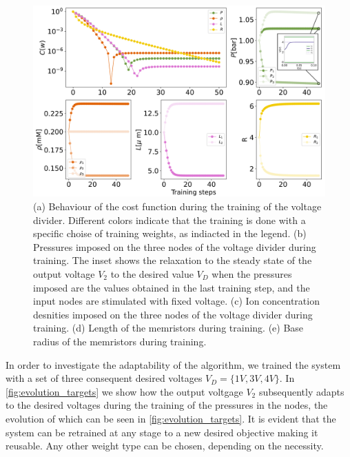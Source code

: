 \documentclass[reprint,superscriptaddress,prb,showkeys]{revtex4-2}
\begin{document}
\begin{figure}[h]
    \centering
    \includegraphics[width=\columnwidth]{plots/voltage_divider/mse_weights_vd.pdf}
    \caption{(a) Behaviour of the cost function during the training of the voltage divider. Different colors indicate that the training is done with a specific choise of training weights, as indiacted in the legend. (b) Pressures imposed on the three nodes of the voltage divider during training. The inset shows the relaxation to the steady state of the output voltage $V_2$ to the desired value $V_D$ when the pressures imposed are the values obtained in the last training step, and the input nodes are stimulated with fixed voltage. (c) Ion concentration desnities imposed on the three nodes of the voltage divider during training. (d) Length of the memristors during training. (e) Base radius of the memristors during training.}\label{fig:mse_weights_vd}
\end{figure} 

In order to investigate the adaptability of the algorithm, we trained the system with a set of three consequent desired voltages $V_D=\{1V, 3V, 4V\}$. In \cref{fig:evolution_targets} we show how the output voltgage $V_2$ subsequently adapts to the desired voltages during the training of the pressures in the nodes, the evolution of which can be seen in \cref{fig:evolution_targets}. It is evident that the system can be retrained at any stage to a new desired objective making it reusable. Any other weight type can be chosen, depending on the necessity.  
\end{document}
